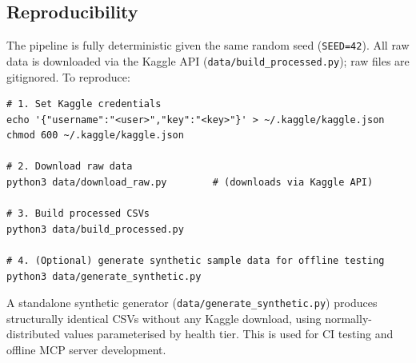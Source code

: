\subsection{Reproducibility}
\label{sec:reproducibility}

The pipeline is fully deterministic given the same random seed
(\texttt{SEED=42}).  All raw data is downloaded via the Kaggle API
(\texttt{data/build\_processed.py}); raw files are gitignored.
To reproduce:

\begin{verbatim}
# 1. Set Kaggle credentials
echo '{"username":"<user>","key":"<key>"}' > ~/.kaggle/kaggle.json
chmod 600 ~/.kaggle/kaggle.json

# 2. Download raw data
python3 data/download_raw.py        # (downloads via Kaggle API)

# 3. Build processed CSVs
python3 data/build_processed.py

# 4. (Optional) generate synthetic sample data for offline testing
python3 data/generate_synthetic.py
\end{verbatim}

\noindent
A standalone synthetic generator (\texttt{data/generate\_synthetic.py})
produces structurally identical CSVs without any Kaggle download, using
normally-distributed values parameterised by health tier.  This is used for
CI testing and offline MCP server development.
